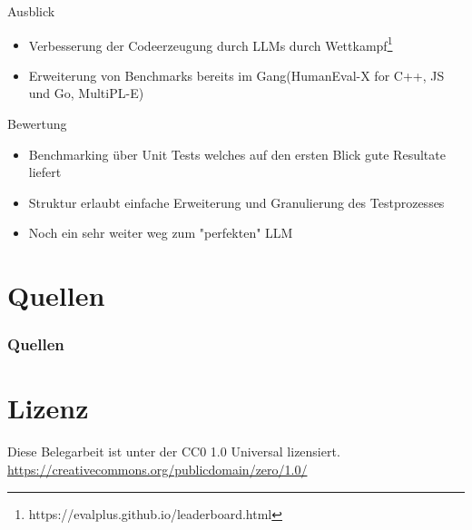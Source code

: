 \documentclass{beamer}              %
\begin{document}

\begin{frame}{Ausblick}
\begin{itemize}
    \item Verbesserung der Codeerzeugung durch LLMs durch Wettkampf\footnote{https://evalplus.github.io/leaderboard.html}
    \item Erweiterung von Benchmarks bereits im Gang(HumanEval-X\cite{zheng2023codegeex} for C++, JS und Go, MultiPL-E)
\end{itemize}
\end{frame}

\begin{frame}{Bewertung}
\begin{itemize}
    \item Benchmarking über Unit Tests welches auf den ersten Blick gute Resultate liefert
    \item Struktur erlaubt einfache Erweiterung und Granulierung des Testprozesses
    \item Noch ein sehr weiter weg zum "perfekten" LLM
\end{itemize}
\end{frame}

\section{Quellen}
\begin{frame}[allowframebreaks]
        \frametitle{Quellen}
        
        
\end{frame}

\section{Lizenz}
\begin{frame}{}
   \centering Diese Belegarbeit ist unter der CC0 1.0 Universal lizensiert. \url{https://creativecommons.org/publicdomain/zero/1.0/}
\end{frame}
\end{document}
